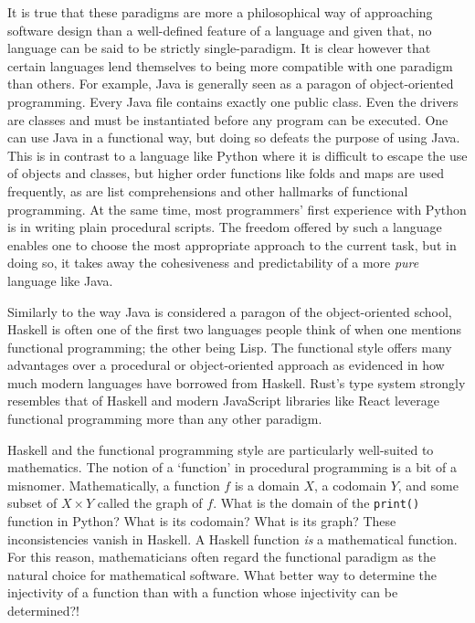 \documentclass[MS, xcolor=dvipsnames]{wfuthesis}
\theoremstyle{definition}
\begin{document}
It is true that these paradigms are more a philosophical way of approaching software design than a well-defined feature of a language and given that, no language can be said to be strictly single-paradigm. It is clear however that certain languages lend themselves to being more compatible with one paradigm than others. For example, Java is generally seen as a paragon of object-oriented programming. Every Java file contains exactly one public class. Even the drivers are classes and must be instantiated before any program can be executed. One can use Java in a functional way, but doing so defeats the purpose of using Java. This is in contrast to a language like Python where it is difficult to escape the use of objects and classes, but higher order functions like folds and maps are used frequently, as are list comprehensions and other hallmarks of functional programming. At the same time, most programmers' first experience with Python is in writing plain procedural scripts. The freedom offered by such a language enables one to choose the most appropriate approach to the current task, but in doing so, it takes away the cohesiveness and predictability of a more \textit{pure} language like Java. \par
Similarly to the way Java is considered a paragon of the object-oriented school, Haskell is often one of the first two languages people think of when one mentions functional programming; the other being Lisp. The functional style offers many advantages over a procedural or object-oriented approach as evidenced in how much modern languages have borrowed from Haskell. Rust's type system strongly resembles that of Haskell \cite{Poss2014} and modern JavaScript libraries like React  leverage functional programming more than any other paradigm. \par
Haskell and the functional programming style are particularly well-suited to mathematics. The notion of a `function' in procedural programming is a bit of a misnomer. Mathematically, a function $f$ is a domain $X$, a codomain $Y$, and some subset of $X \times Y$ called the graph of $f$. What is the domain of the \lstinline{print()} function in Python? What is its codomain? What is its graph? These inconsistencies vanish in Haskell. A Haskell function \textit{is} a mathematical function. For this reason, mathematicians often regard the functional paradigm as the natural choice for mathematical software. What better way to determine the injectivity of a function than with a function whose injectivity can be determined?! \par
\end{document}
